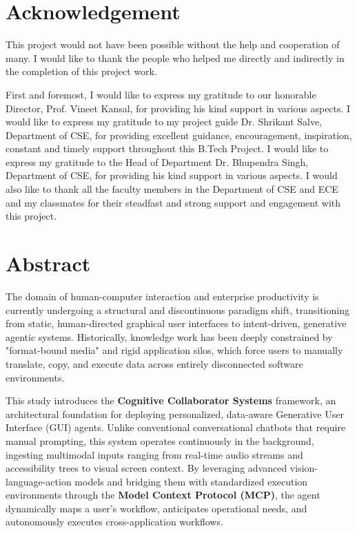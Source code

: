 \documentclass[12pt, a4paper]{report}
\begin{document}
\newpage
\chapter*{Acknowledgement}

This project would not have been possible without the help and cooperation of many. I would like to thank the people who helped me directly and indirectly in the completion of this project work.

First and foremost, I would like to express my gratitude to our honorable Director, Prof. Vineet Kansal, for providing his kind support in various aspects. I would like to express my gratitude to my project guide Dr. Shrikant Salve, Department of CSE, for providing excellent guidance, encouragement, inspiration, constant and timely support throughout this B.Tech Project. I would like to express my gratitude to the Head of Department Dr. Bhupendra Singh, Department of CSE, for providing his kind support in various aspects. I would also like to thank all the faculty members in the Department of CSE and ECE and my classmates for their steadfast and strong support and engagement with this project.


\newpage
\chapter*{Abstract}

The domain of human-computer interaction and enterprise productivity is currently undergoing a structural and discontinuous paradigm shift, transitioning from static, human-directed graphical user interfaces to intent-driven, generative agentic systems. Historically, knowledge work has been deeply constrained by "format-bound media" and rigid application silos, which force users to manually translate, copy, and execute data across entirely disconnected software environments.

This study introduces the \textbf{Cognitive Collaborator Systems} framework, an architectural foundation for deploying personalized, data-aware Generative User Interface (GUI) agents. Unlike conventional conversational chatbots that require manual prompting, this system operates continuously in the background, ingesting multimodal inputs ranging from real-time audio streams and accessibility trees to visual screen context. By leveraging advanced vision-language-action models and bridging them with standardized execution environments through the \textbf{Model Context Protocol (MCP)}, the agent dynamically maps a user's workflow, anticipates operational needs, and autonomously executes cross-application workflows.
\end{document}
